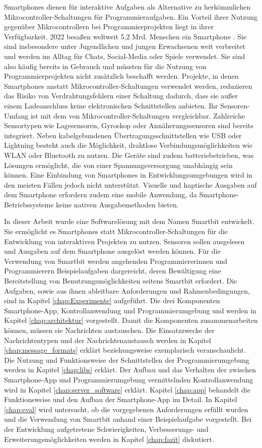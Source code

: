\documentclass[11pt,a4paper]{report}
\begin{document}
Smartphones dienen für interaktive Aufgaben als Alternative zu herkömmlichen Mikrocontroller-Schaltungen für Programmieraufgaben.
Ein Vorteil ihrer Nutzung gegenüber Mikrocontrollern bei Programmierprojekten liegt in ihrer Verfügbarkeit.
2022 besaßen weltweit 5,2 Mrd. Menschen ein Smartphone \cite{smartphone_users}.
Sie sind insbesondere unter Jugendlichen und jungen Erwachsenen weit verbreitet und werden im Alltag für Chats, Social-Media oder Spiele verwendet.
Sie sind also häufig bereits in Gebrauch und müssten für die Nutzung von Programmierprojekten nicht zusätzlich beschafft werden.
Projekte, in denen Smartphones anstatt Mikrocontroller-Schaltungen verwendet werden, reduzieren das Risiko von Verdrahtungsfehlern einer Schaltung dadurch, dass sie außer einem Ladeanschluss keine elektronischen Schnittstellen anbieten.
Ihr Sensoren-Umfang ist mit dem von Mikrocontroller-Schaltungen vergleichbar.
Zahlreiche Sensortypen wie Lagesensoren, Gyroskop oder Annäherungssensoren sind bereits integriert.
Neben kabelgebundenen Übertragungsschnittstellen wie USB oder Lightning besteht auch die Möglichkeit, drahtlose Verbindungsmöglichkeiten wie WLAN oder Bluetooth zu nutzen.
Die Geräte sind zudem batteriebetrieben, was Lösungen ermöglicht, die von einer Spannungsversorgung unabhängig sein können. 
Eine Einbindung von Smartphones in Entwicklungsumgebungen wird in den meisten Fällen jedoch nicht unterstützt.
Visuelle und haptische Ausgaben auf dem Smartphone erfordern zudem eine mobile Anwendung, da Smartphone-Betriebssysteme keine nativen Ausgabemethoden bieten.

In dieser Arbeit wurde eine Softwarelösung mit dem Namen Smartbit entwickelt.
Sie ermöglicht es Smartphones statt Mikrocontroller-Schaltungen für die Entwicklung von interaktiven Projekten zu nutzen. 
Sensoren sollen ausgelesen und Ausgaben auf dem Smartphone ausgelöst werden können.
Für die Verwendung von Smartbit werden angehenden Programmiererinnen und Programmierern Beispielaufgaben dargereicht, deren Bewältigung eine Bereitstellung von Benutzungsmöglichkeiten seitens Smartbit erfordert.
Die Aufgaben, sowie aus ihnen ableitbare Anforderungen und Rahmenbedingungen, sind in Kapitel \ref{chap:Experimente} aufgeführt.
Die drei Komponenten Smartphone-App, Kontrollanwendung und Programmierumgebung und werden in Kapitel \ref{chap:architektur} vorgestellt.
Damit die Komponenten zusammenarbeiten können, müssen sie Nachrichten austauschen.
Die Einsatzzwecke der Nachrichtentypen und der Nachrichtenaustausch werden in Kapitel \ref{chap:message_formats} erklärt beziehungsweise exemplarisch veranschaulicht.
Die Nutzung und Funktionsweise der Schnittstellen der Programmierumgebung werden in Kapitel \ref{chap:libs} erklärt.
Der Aufbau und das Verhalten der zwischen Smartphone-App und Programmierumgebung vermittelnden Kontrollanwendung wird in Kapitel \ref{chap:server_software} erklärt.
Kapitel \ref{chap:app} behandelt die Funktionsweise und den Aufbau der Smartphone-App im Detail.
In Kapitel \ref{chap:eval} wird untersucht, ob die vorgegebenen Anforderungen erfüllt wurden und die Verwendung von Smartbit anhand einer Beispielaufgabe vorgestellt.
Bei der Entwicklung aufgetretene Schwierigkeiten, Verbesserungs- und Erweiterungsmöglichkeiten werden in Kapitel \ref{chap:fazit} diskutiert.
\end{document}
